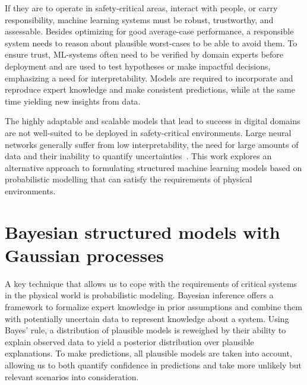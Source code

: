 If they are to operate in safety-critical areas, interact with people, or carry responsibility, machine learning systems must be robust, trustworthy, and assessable.
Besides optimizing for good average-case performance, a responsible system needs to reason about plausible worst-cases to be able to avoid them.
To ensure trust, ML-systems often need to be verified by domain experts before deployment and are used to test hypotheses or make impactful decisions, emphasizing a need for interpretability.
Models are required to incorporate and reproduce expert knowledge and make consistent predictions, while at the same time yielding new insights from data.

The highly adaptable and scalable models that lead to success in digital domains are not well-suited to be deployed in safety-critical environments.
Large neural networks generally suffer from low interpretability, the need for large amounts of data and their inability to quantify uncertainties~\parencite{goodfellow_deep_2016}.
This work explores an alternative approach to formulating structured machine learning models based on probabilistic modelling that can satisfy the requirements of physical environments.

\section{Bayesian structured models with Gaussian processes}
A key technique that allows us to cope with the requirements of critical systems in the physical world is probabilistic modeling.
Bayesian inference offers a framework to formalize expert knowledge in prior assumptions and combine them with potentially uncertain data to represent knowledge about a system.
Using Bayes' rule, a distribution of plausible models is reweighed by their ability to explain observed data to yield a posterior distribution over plausible explanations.
To make predictions, all plausible models are taken into account, allowing us to both quantify confidence in predictions and take more unlikely but relevant scenarios into consideration.

